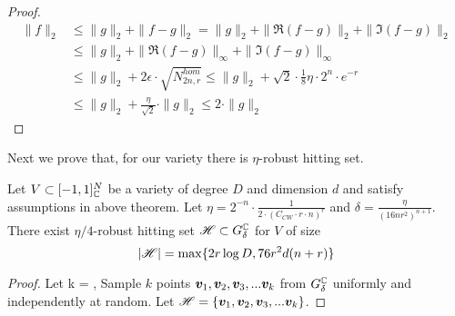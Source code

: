 {\begin{proof}
\begin{align*}
\|f\|_2 &\le \|g\|_2+\|f-g\|_2 = \|g\|_2+\|\Re(f-g)\|_2+\|\Im(f-g)\|_2\\
&\le \|g\|_2+\|\Re(f-g)\|_\infty+\|\Im(f-g)\|_\infty\\
&\le \|g\|_2+2\epsilon\cdot\sqrt{N_{2n,r}^{hom}} \le \|g\|_2 + \sqrt 2 \cdot \frac{1}{8}\eta\cdot2^n\cdot e^{-r}\\
&\le \|g\|_2+\frac{\eta}{\sqrt 2}\cdot\|g\|_2 \le 2\cdot \|g\|_2
\end{align*}
\end{proof}
Next we prove that, for our variety there is $\eta$-robust hitting set.
\begin{theorem}
Let $V\subset[-1,1]^{N}_{\mathbb{C}}$ be a variety of degree $D$ and dimension $d$ and satisfy assumptions in above theorem. Let $\eta = 2^{-n}\cdot\frac{1}{2\cdot(C_{CW}\cdot r \cdot n)^r}$ and $\delta = \frac{\eta}{(16nr^2)^{n+1}}$. There exist $\eta/4$-robust hitting set $\mathscr{H}\subset G_\delta^{\mathbb{C}}$ for $V$ of size 
$$
|\mathscr{H}| = \max \{2r\log D,76r^2d(n+r)\}
$$
\end{theorem}
\begin{proof}
Let k = , Sample $k$ points $\bm v_1,\bm v_2,\bm v_3, ... \bm v_k$ from $G_\delta^{\mathbb{C}}$ uniformly and independently at random. Let $\mathscr{H} = \{\bm v_1,\bm v_2,\bm v_3, ... \bm v_k\}$.


\end{proof}}
